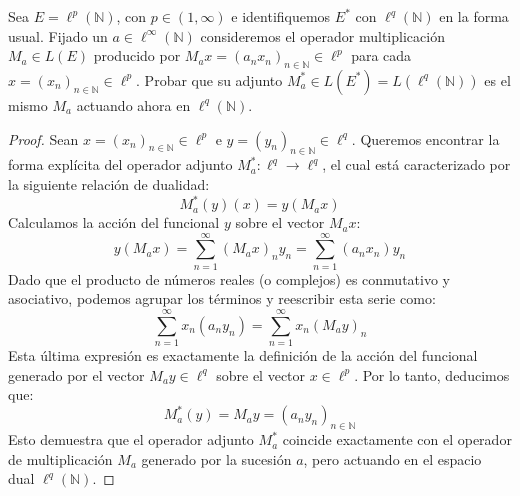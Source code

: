 \documentclass{article}
\theoremstyle{definition}
\newcommand{\N}{\mathbb{N}}
\newenvironment{ejercicio}[1]{\begin{trivlist}
\item[\hskip \labelsep {\bfseries Ejercicio}\hskip \labelsep {\bfseries #1.}]}{\end{trivlist}}
\begin{document}
\begin{ejercicio}{2}
	Sea \( E = \ell^p(\N) \), con \( p \in (1, \infty) \) e identifiquemos \( E^* \) con \( \ell^q(\N) \) en la forma usual. Fijado un \( a \in \ell^{\infty}(\N) \) consideremos el operador multiplicación \( M_a \in L(E) \) producido por \( M_a x = {(a_n x_n)}_{n \in \N} \in \ell^p \) para cada \( x = {(x_n)}_{n \in \N} \in \ell^p \). Probar que su adjunto \( M_a^* \in L(E^*) = L(\ell^q(\N)) \) es el mismo \( M_a \) actuando ahora en \( \ell^q(\N) \).
\end{ejercicio}
\begin{proof}
	Sean \( x = {(x_n)}_{n \in \N} \in \ell^p \) e \( y = {(y_n)}_{n \in \N} \in \ell^q \). Queremos encontrar la forma explícita del operador adjunto \( M_a^*: \ell^q \to \ell^q \), el cual está caracterizado por la siguiente relación de dualidad:
	\[ M_a^*(y)(x) = y(M_a x) \]
	Calculamos la acción del funcional \( y \) sobre el vector \( M_a x \):
	\[ y(M_a x) = \sum_{n=1}^{\infty} {(M_a x)}_n y_n = \sum_{n=1}^{\infty} (a_n x_n) y_n \]
	Dado que el producto de números reales (o complejos) es conmutativo y asociativo, podemos agrupar los términos y reescribir esta serie como:
	\[ \sum_{n=1}^{\infty} x_n (a_n y_n) = \sum_{n=1}^{\infty} x_n {(M_a y)}_n \]
	Esta última expresión es exactamente la definición de la acción del funcional generado por el vector \( M_a y \in \ell^q \) sobre el vector \( x \in \ell^p \). Por lo tanto, deducimos que:
	\[ M_a^*(y) = M_a y = {(a_n y_n)}_{n \in \N} \]
	Esto demuestra que el operador adjunto \( M_a^* \) coincide exactamente con el operador de multiplicación \( M_a \) generado por la sucesión \( a \), pero actuando en el espacio dual \( \ell^q(\N) \).
\end{proof}

\vspace{0.5cm}
\end{document}
